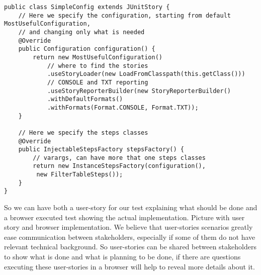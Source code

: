 \lstset{language=Java}
\begin{lstlisting}
public class SimpleConfig extends JUnitStory {
    // Here we specify the configuration, starting from default MostUsefulConfiguration,
    // and changing only what is needed
    @Override
    public Configuration configuration() {
    	return new MostUsefulConfiguration()
        	// where to find the stories
            .useStoryLoader(new LoadFromClasspath(this.getClass())) 
            // CONSOLE and TXT reporting
            .useStoryReporterBuilder(new StoryReporterBuilder()
            .withDefaultFormats()
            .withFormats(Format.CONSOLE, Format.TXT));
    }
 
    // Here we specify the steps classes
    @Override
    public InjectableStepsFactory stepsFactory() {    	
        // varargs, can have more that one steps classes
        return new InstanceStepsFactory(configuration(),
         new FilterTableSteps());
    }
}
\end{lstlisting}

So we can have both a user-story for our test explaining what should be done and a browser executed
test showing the actual implementation. Picture with user story and browser implementation. We believe that user-stories 
scenarios greatly ease communication between stakeholders, 
especially if some of them do not have relevant technical background.
So user-stories can be shared between stakeholders to show what is done and what
is planning to be done, if there are questions 
executing these user-stories in a browser will help to reveal more details about it. 
   

    
